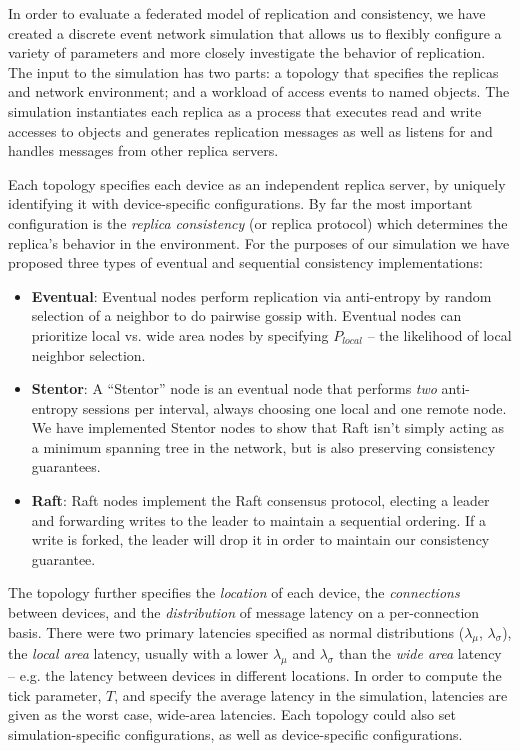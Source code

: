 \documentclass[10pt,conference,compsocconf,letterpaper]{IEEEtran}
\begin{document}
In order to evaluate a federated model of replication and consistency, we have created a discrete event network simulation that allows us to flexibly configure a variety of parameters and more closely investigate the behavior of replication. The input to the simulation has two parts: a topology that specifies the replicas and network environment; and a workload of access events to named objects. The simulation instantiates each replica as a process that executes read and write accesses to objects and generates replication messages as well as listens for and handles messages from other replica servers.

Each topology specifies each device as an independent replica server, by uniquely identifying it with device-specific configurations. By far the most important configuration is the \textit{replica consistency} (or replica protocol) which determines the replica's behavior in the environment. For the purposes of our simulation we have proposed three types of eventual and sequential consistency implementations:

\begin{itemize}
    \item \textbf{Eventual}: Eventual nodes perform replication via anti-entropy by random selection of a neighbor to do pairwise gossip with. Eventual nodes can prioritize local vs. wide area nodes by specifying $P_{local}$ -- the likelihood of local neighbor selection.
    \item \textbf{Stentor}: A ``Stentor'' node is an eventual node that performs \textit{two} anti-entropy sessions per interval, always choosing one local and one remote node. We have implemented Stentor nodes to show that Raft isn't simply acting as a minimum spanning tree in the network, but is also preserving consistency guarantees.
    \item \textbf{Raft}: Raft nodes implement the Raft consensus protocol, electing a leader and forwarding writes to the leader to maintain a sequential ordering. If a write is forked, the leader will drop it in order to maintain our consistency guarantee.
\end{itemize}

The topology further specifies the \textit{location} of each device, the \textit{connections} between devices, and the \textit{distribution} of message latency on a per-connection basis. There were two primary latencies specified as normal distributions ($\lambda_{\mu}$, $\lambda_{\sigma}$), the \textit{local area} latency, usually with a lower $\lambda_{\mu}$ and $\lambda_{\sigma}$ than the \textit{wide area} latency -- e.g. the latency between devices in different locations. In order to compute the tick parameter, $T$, and specify the average latency in the simulation, latencies are given as the worst case, wide-area latencies. Each topology could also set simulation-specific configurations, as well as device-specific configurations.
\end{document}
